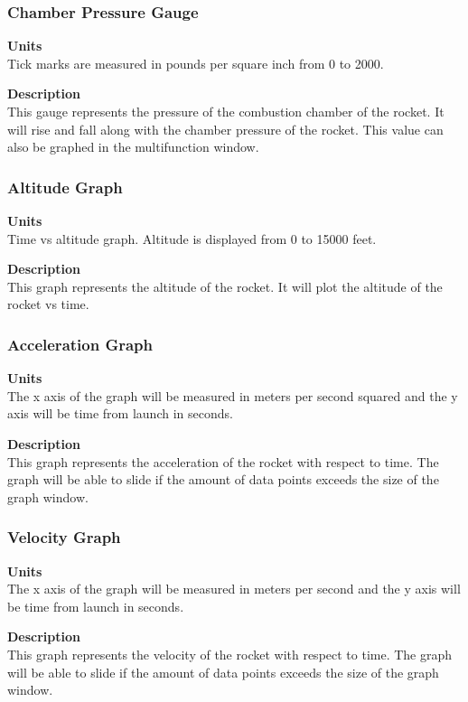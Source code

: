 \documentclass[10pt,draftclsnofoot,onecolumn,compsoc]{IEEEtran}
\begin{document}
\subsubsection{Chamber Pressure Gauge}
{\bf Units} \\ Tick marks are measured in pounds per square inch from 0 to 2000.\par
{\bf Description} \\ This gauge represents the pressure of the combustion chamber of the rocket. It will rise and fall along with the chamber pressure of the rocket. This value can also be graphed in the multifunction window. \par

\subsubsection{Altitude Graph}
{\bf Units} \\ Time vs altitude graph. Altitude is displayed from 0 to 15000 feet.\par
{\bf Description} \\ This graph represents the altitude of the rocket. It will plot the altitude of the rocket vs time. \par

\subsubsection{Acceleration Graph}
{\bf Units} \\ The x axis of the graph will be measured in meters per second squared and the y axis will be time from launch in seconds.\par
{\bf Description} \\ This graph represents the acceleration of the rocket with respect to time. The graph will be able to slide if the amount of data points exceeds the size of the graph window. \par

\subsubsection{Velocity Graph}
{\bf Units} \\ The x axis of the graph will be measured in meters per second and the y axis will be time from launch in seconds.\par
{\bf Description} \\ This graph represents the velocity of the rocket with respect to time. The graph will be able to slide if the amount of data points exceeds the size of the graph window. \par
\end{document}
